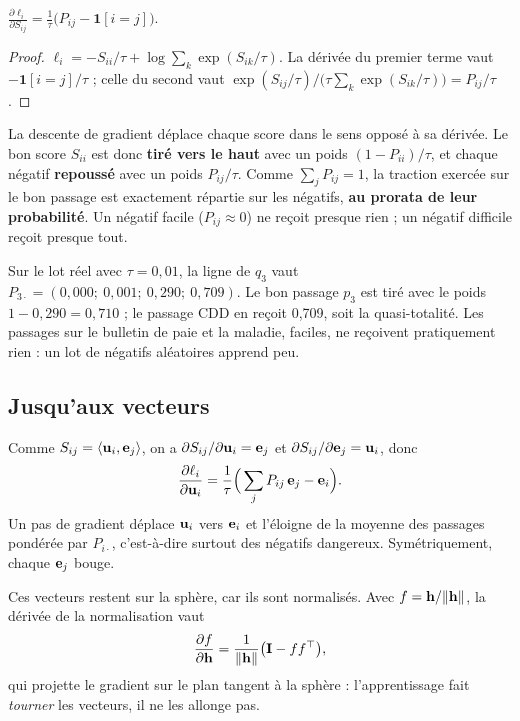 \begin{proposition}\label{prop:gradient}
$\displaystyle \frac{\partial \ell_i}{\partial S_{ij}} = \frac{1}{\tau}\big(P_{ij} - \mathbf{1}[i = j]\big)$.
\end{proposition}

\begin{proof}
$\ell_i = -S_{ii}/\tau + \log \sum_k \exp(S_{ik}/\tau)$. La dérivée du premier terme vaut $-\mathbf{1}[i=j]/\tau$ ;
celle du second vaut $\exp(S_{ij}/\tau)/\big(\tau\sum_k \exp(S_{ik}/\tau)\big) = P_{ij}/\tau$.
\end{proof}

La descente de gradient déplace chaque score dans le sens opposé à sa dérivée. Le bon score $S_{ii}$ est donc
\textbf{tiré vers le haut} avec un poids $(1 - P_{ii})/\tau$, et chaque négatif \textbf{repoussé} avec un poids
$P_{ij}/\tau$. Comme $\sum_j P_{ij} = 1$, la traction exercée sur le bon passage est exactement répartie sur les
négatifs, \textbf{au prorata de leur probabilité}. Un négatif facile ($P_{ij} \approx 0$) ne reçoit presque rien ; un
négatif difficile reçoit presque tout.

\mesure Sur le lot réel avec $\tau = 0{,}01$, la ligne de $q_3$ vaut
$P_{3\cdot} = (0{,}000 ;\ 0{,}001 ;\ 0{,}290 ;\ 0{,}709)$. Le bon passage $p_3$ est tiré avec le poids
$1 - 0{,}290 = 0{,}710$ ; le passage CDD en reçoit 0,709, soit la quasi-totalité. Les passages sur le bulletin
de paie et la maladie, faciles, ne reçoivent pratiquement rien : un lot de négatifs aléatoires apprend peu.

\subsection{Jusqu'aux vecteurs}

Comme $S_{ij} = \langle \mathbf{u}_i, \mathbf{e}_j \rangle$, on a $\partial S_{ij}/\partial \mathbf{u}_i = \mathbf{e}_j$ et
$\partial S_{ij}/\partial \mathbf{e}_j = \mathbf{u}_i$, donc
\[
  \frac{\partial \ell_i}{\partial \mathbf{u}_i} = \frac{1}{\tau}\Big(\sum_{j} P_{ij}\,\mathbf{e}_j - \mathbf{e}_i\Big).
\]
Un pas de gradient déplace $\mathbf{u}_i$ vers $\mathbf{e}_i$ et l'éloigne de la moyenne des passages pondérée par
$P_{i\cdot}$, c'est-à-dire surtout des négatifs dangereux. Symétriquement, chaque $\mathbf{e}_j$ bouge.

Ces vecteurs restent sur la sphère, car ils sont normalisés. Avec $f = \mathbf{h}/\lVert\mathbf{h}\rVert$, la dérivée de la
normalisation vaut
\[
  \frac{\partial f}{\partial \mathbf{h}} = \frac{1}{\lVert\mathbf{h}\rVert}\big(\mathbf{I} - f f^{\top}\big),
\]
qui projette le gradient sur le plan tangent à la sphère : l'apprentissage fait \emph{tourner} les vecteurs, il ne
les allonge pas.

